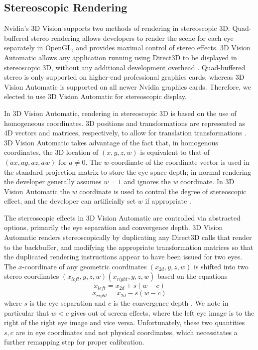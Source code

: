 \documentclass[pageno]{jpaper}
\begin{document}
\subsection{Stereoscopic Rendering}
Nvidia's 3D Vision supports two methods of rendering in stereoscopic 3D. Quad-buffered stereo rendering allows developers to render the scene for each
eye separately in OpenGL, and provides maximal control of stereo effects. 3D Vision Automatic allows any application running using Direct3D to be
displayed in stereoscopic 3D, without any additional development overhead \cite{nvidia3dvision}. Quad-buffered stereo is only supported on higher-end
professional graphics cards, whereas 3D Vision Automatic is supported on all newer Nvidia graphics cards. Therefore, we elected to use 3D Vision Automatic
for stereoscopic display.

In 3D Vision Automatic, rendering in stereoscopic 3D is based on the use of homogeneous coordinates. 3D positions and transformations are represented
as 4D vectors and matrices, respectively, to allow for translation transformations \cite{graphicstextbook}. 3D Vision Automatic takes advantage of the
fact that, in homogenous coordinates, the 3D location of $(x, y, z, w)$ is equivalent to that of $(ax, ay, az, aw)$ for $a \ne 0$. The $w$-coordinate
of the coordinate vector is used in the standard projection matrix to store the eye-space depth; in normal rendering the developer generally assumes
$w=1$ and ignores the $w$ coordinate. In 3D Vision Automatic the $w$ coordinate is used to control the degree of stereoscopic effect, and the
developer can artificially set $w$ if appropriate \cite{nvidia3dvision}.

The stereoscopic effects in 3D Vision Automatic are controlled via abstracted options, primarily the eye separation and convergence depth.
3D Vision Automatic renders stereoscopically by duplicating any Direct3D calls that render to the backbuffer, and modifying the appropriate
transformation matrices so that the duplicated rendering instructions appear to have been issued for two eyes. The $x$-coordinate of any geometric
coordinates $(x_{2d}, y, z, w)$ is shifted into two stereo coordinates $(x_{left}, y, z, w)(x_{right}, y, z, w)$ based on the equations
$$x_{left} = x_{2d} + s(w - c)$$
$$x_{right} = x_{2d} - s(w - c)$$
where $s$ is the eye separation and $c$ is the convergence depth \cite{nvidia3dvision}. We note in particular that $w<c$ gives out of screen effects, where
the left eye image is to the right of the right eye image and vice versa. Unfortunately, these two quantities $s, c$ are in eye coordinates and not
physical coordinates, which necessitates a further remapping step for proper calibration.
\end{document}
